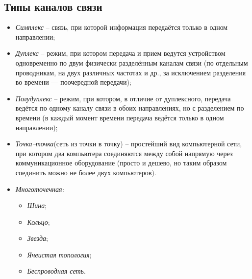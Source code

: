 \subsection{Типы каналов связи}
\begin{itemize}
\item \emph{Симплекс} -- связь, при которой информация передаётся только в одном направлении;
\item \emph{Дуплекс} -- режим, при котором передача и прием ведутся устройством одновременно по двум физически разделённым каналам связи (по отдельным проводникам, на двух различных частотах и др., за исключением разделения во времени — поочередной передачи);
\item \emph{Полудуплекс} -- режим, при котором, в отличие от дуплексного, передача ведётся по одному каналу связи в обоих направлениях, но с разделением по времени (в каждый момент времени передача ведётся только в одном направлении);
\item \emph{Точка--точка}(сеть из точки в точку) -- простейший вид компьютерной сети, при котором два компьютера соединяются между собой напрямую через коммуникационное оборудование (просто и дешево, но таким образом соединить можно не более двух компьютеров).
\newpage
\item \emph{Многоточечная:}
\begin{itemize}
\item \emph{Шина};
\item \emph{Кольцо};
\item \emph{Звезда};
\item \emph{Ячеистая топология};
\item \emph{Беспроводная сеть}.
\end{itemize}
\end{itemize}